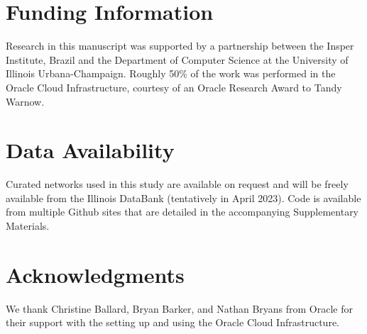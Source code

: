 \documentclass[11pt]{article}   	%
\begin{document}
\section*{Funding Information} Research in this manuscript was supported by a partnership between the Insper Institute, Brazil and the Department of Computer Science at the University of Illinois Urbana-Champaign. Roughly
50\% of the work was performed in the Oracle Cloud Infrastructure, courtesy of an Oracle Research Award to Tandy Warnow.

\section*{Data Availability}
Curated networks used in this study are available on request and will be freely available from the Illinois DataBank (tentatively in April 2023). Code is available from multiple Github sites that are detailed in the accompanying
Supplementary Materials.

\section*{Acknowledgments} We thank Christine Ballard, Bryan Barker, and Nathan Bryans from Oracle for their support with the setting up and using the Oracle Cloud Infrastructure.



\end{document}
